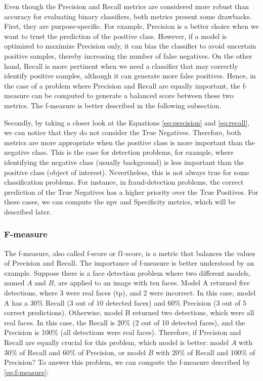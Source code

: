 Even though the Precision and Recall metrics are considered more robust than accuracy for evaluating binary classifiers, both metrics present some drawbacks. First, they are purpose-specific. For example, Precision is a better choice when we want to trust the prediction of the positive class. However, if a model is optimized to maximize Precision only, it can bias the classifier to avoid uncertain positive samples, thereby increasing the number of false negatives. On the other hand, Recall is more pertinent when we need a classifier that may correctly identify positive samples, although it can generate more false positives. Hence, in the case of a problem where Precision and Recall are equally important, the f-measure can be computed to generate a balanced score between these two metrics. The f-measure is better described in the following subsection.

Secondly, by taking a closer look at the Equations \ref{eq:precision} and \ref{eq:recall}, we can notice that they do not consider the True Negatives. Therefore, both metrics are more appropriate when the positive class is more important than the negative class. This is the case for detection problems, for example, where identifying the negative class (usually background) is less important than the positive class (object of interest). Nevertheless, this is not always true for some classification problems. For instance, in fraud-detection problems, the correct prediction of the True Negatives has a higher priority over the True Positives. For these cases, we can compute the \acl{npv} and Specificity metrics, which will be described later.

\subsubsection{F-measure}

The f-measure, also called f-score or f1-score, is a metric that balances the values of Precision and Recall. The importance of f-measure is better understood by an example. Suppose there is a face detection problem where two different models, named $A$ and $B$, are applied to an image with ten faces. Model A returned five detections, where 3 were real faces (\acs{tp}), and 2 were incorrect. In this case, model A has a 30\% Recall (3 out of 10 detected faces) and 60\% Precision (3 out of 5 correct predictions). Otherwise, model B returned two detections, which were all real faces. In this case, the Recall is 20\% (2 out of 10 detected faces), and the Precision is 100\% (all detections were real faces). Therefore, if Precision and Recall are equally crucial for this problem, which model is better: model $A$ with 30\% of Recall and 60\% of Precision, or model $B$ with 20\% of Recall and 100\% of Precision? To answer this problem, we can compute the f-measure described by \autoref{eq:f-measure}: 

